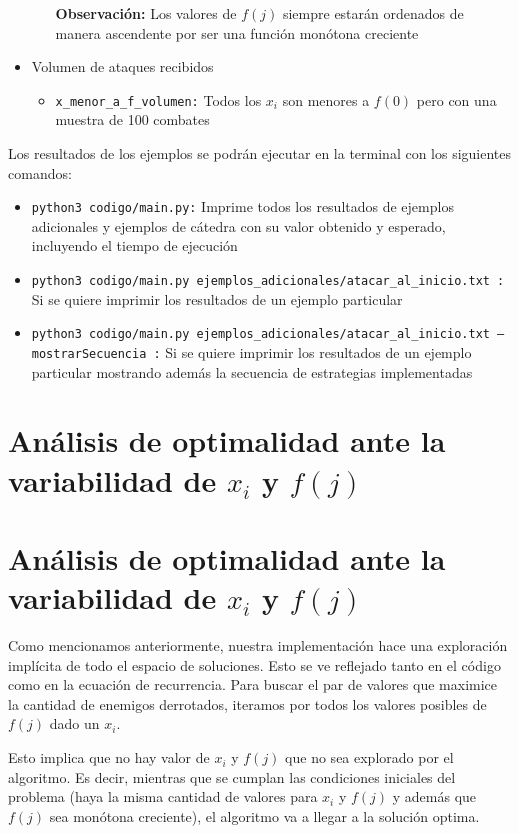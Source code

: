 \documentclass{article}
\begin{document}
\begin{itemize}
\begin{itemize}
        \textbf{Observación: }Los valores de $f(j)$ siempre estarán ordenados de manera ascendente por ser una función monótona creciente
    \end{itemize}
    \item Volumen de ataques recibidos
    \begin{itemize}
        \item \texttt{x\_menor\_a\_f\_volumen:} Todos los $x_i$ son menores a $f(0)$ pero con una muestra de 100 combates
    \end{itemize}
\end{itemize}

Los resultados de los ejemplos se podrán ejecutar en la terminal con los siguientes comandos:

\begin{itemize}
    \item \texttt{python3 codigo/main.py:} Imprime todos los resultados de ejemplos adicionales y ejemplos de cátedra con su valor obtenido y esperado, incluyendo el tiempo de ejecución
    \item \texttt{python3 codigo/main.py ejemplos\_adicionales/atacar\_al\_inicio.txt :} Si se quiere imprimir los resultados de un ejemplo particular
    \item \texttt{python3 codigo/main.py ejemplos\_adicionales/atacar\_al\_inicio.txt --mostrarSecuencia :} Si se quiere imprimir los resultados de un ejemplo particular mostrando además la secuencia de estrategias implementadas
\end{itemize}

\section{Análisis de optimalidad ante la variabilidad de $x_i$ y $f(j)$}

\section{Análisis de optimalidad ante la variabilidad de $x_i$ y $f(j)$}
Como mencionamos anteriormente, nuestra implementación hace una exploración implícita de todo el espacio de soluciones. Esto se ve reflejado tanto en el código como en la ecuación de recurrencia. Para buscar el par de valores que maximice la cantidad de enemigos derrotados, iteramos por todos los valores posibles de $f(j)$ dado un $x_i$.

Esto implica que no hay valor de $x_i$ y $f(j)$ que no sea explorado por el algoritmo. Es decir, mientras que se cumplan las condiciones iniciales del problema (haya la misma cantidad de valores para $x_i$ y $f(j)$ y además que $f(j)$ sea monótona creciente), el algoritmo va a llegar a la solución optima.
\end{document}
